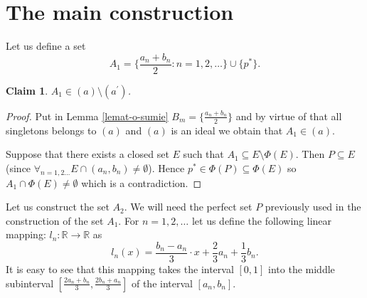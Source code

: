 \documentclass[12pt]{amsart}
\theoremstyle{plain}
\newtheorem{claim}[theorem]{Claim}
\theoremstyle{definition}
\theoremstyle{remark}
\newcommand{\real}{\mathbb{R}}
\newcommand{\aideal}{\mathit{(a)}}
\newcommand{\aidealprime}{\mathit{(a^\prime)}}
\begin{document}
\section{The main construction}

Let us define a set
\[ A_1 = \lbrace \frac{a_n + b_n}{2} \colon n = 1,2,\ldots\rbrace \cup \lbrace p^* \rbrace.
\]

\begin{claim}
  $A_1 \in \aideal \setminus \aidealprime$.
\end{claim}  
\begin{proof}
Put in Lemma \ref{lemat-o-sumie} 
$B_m = \lbrace \frac{a_n + b_n}{2} \rbrace$
and by virtue of that all singletons belongs to
$\aideal$ and $\aideal$
is an ideal we obtain that $A_1 \in \aideal$.

\smallskip

Suppose that there exists a closed set $E$ such that
$A_1 \subseteq E \setminus \Phi(E)$.
Then $P \subseteq E$
(since $\forall_{n=1,2\ldots} E \cap (a_n, b_n) \not= \emptyset$).
Hence $p^* \in \Phi(P) \subseteq \Phi(E)$ so $A_1 \cap \Phi(E) \not= \emptyset$
which is a contradiction.
\end{proof}

Let us construct the set $A_2$.
We will need the perfect set $P$
previously used in the construction of the set
$A_1$.
For $n = 1,2,\ldots$ let us define the following
linear mapping:
$l_n\colon \real\to\real$ as
\[l_n(x) = \frac{b_n - a_n}{3} \cdot x + \frac{2}{3} a_n + \frac{1}{3} b_n.\]
It is easy to see that this mapping
takes the interval $[0,1]$ into the 
middle subinterval $[\frac{2a_n + b_n}{3}, \frac{2b_n + a_n}{3}]$
of the interval $[a_n, b_n]$.
\end{document}
